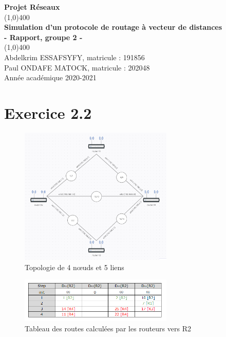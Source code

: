 \documentclass[11pt]{article}
\begin{document}
\begin{titlepage}
\begin{center}
\vspace*{1cm}
\Large{\textbf{Projet Réseaux}}\\
\vfill
\line(1,0){400}\\[1mm]
\huge{\textbf{Simulation d'un protocole de routage à vecteur de distances}}\\[3mm]
\Large{\textbf{- Rapport, groupe 2 -}}\\[1mm]
\line(1,0){400}\\
\vfill
Abdelkrim ESSAFSYFY, matricule : 191856\\
Paul ONDAFE MATOCK, matricule : 202048\\
Année académique 2020-2021
\end{center}
\end{titlepage}

\tableofcontents
\thispagestyle{empty}
\clearpage
\setcounter{page}{1}

\section{Exercice 2.2}
\begin{figure} [h!]
\centering
  \includegraphics[width=0.65\textwidth]{../documents/topology-figure.png}
  \caption{Topologie de 4 nœuds et 5 liens}
   \label{fig:topology}
\end{figure}
\begin{figure} [h!]
\centering
  \includegraphics[width=0.65\textwidth]{../documents/demo-table.png}
  \caption{Tableau des routes calculées par les routeurs vers R2}
   \label{fig:table}
\end{figure}
\end{document}
